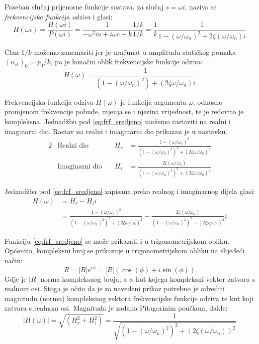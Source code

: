 Poseban slučaj prijenosne funkcije sustava, za slučaj $s=\omega i$, naziva se
\textit{frekvencijska funkcija odziva} i glasi:
\begin{equation} \label{eq:frf_nesredjeno}
    H(\omega i) = \frac{H(\omega i)}{P(\omega i)}
                = \frac{1}{-\omega^2 m + i\omega c + k}\frac{1/k}{1/k}
                = \frac{1}{k}\frac{1}{1-(\omega/\omega_n)^2+2\zeta(\omega/\omega_n)i}
\end{equation}

Član $1/k$ možemo zanemariti jer je uračunat u amplitudu statičkog pomaka $(u_{st})_0=p_0/k$,
pa je konačni oblik frekvencijske funkcije odziva:
\begin{equation}\label{eq:frf_sredjeno}
    H(\omega) = \frac{1}{\left(1-(\omega/\omega_n)^2\right)+\left(2\zeta\omega/\omega_n\right)i}
\end{equation}

Frekvencijska funkcija odziva $H(\omega)$ je funkcija argumenta $\omega$, odnosno promjenom
frekvencije pobude, mjenja se i njezina vrijednost, te je redovito je kompleksna.
Jednadžbu pod \eqref{eq:frf_sredjeno} možemo rastaviti na realni i imaginarni dio.
Rastav na realni i imaginarni dio prikazan je u nastavku.
\begin{alignat}{2}
    &\text{Realni dio} & H_r &= \frac{1-(\omega/\omega_n)^2}{(1-(\omega/\omega_n)^2)^2+(2\zeta\omega/\omega_n)^2}
        \label{eq:realni_dio_frf}\\
    &\text{Imaginarni dio}\quad & H_i &=\frac{2\zeta(\omega/\omega_n)}{(1-(\omega/\omega_n)^2)^2+(2\zeta\omega/\omega_n)^2}
        \label{eq:imaginarni_dio_frf}
\end{alignat}

Jednadžba pod \eqref{eq:frf_sredjeno} zapisana preko realnog i imaginarnog dijela
glasi:
\begin{equation}\label{eq:frf_pravokutni}
    \begin{split}
        H(\omega) &= H_r - H_ii  \\
              &= \frac{1-(\omega/\omega_n)^2}{(1-(\omega/\omega_n)^2)^2+(2\zeta\omega/\omega_n)^2}
              -\frac{2\zeta(\omega/\omega_n)}{(1-(\omega/\omega_n)^2)^2+(2\zeta\omega/\omega_n)^2}i
    \end{split}
\end{equation}

Funkciju \eqref{eq:frf_sredjeno} se može prikazati i u trigonometrijskom obliku.
Općenito, kompleksni broj se prikazuje u trigonometrijskom obliku na slijedeći
način:
\begin{equation}\label{eq:trig_zapis_kompleksni_br}
    R=|R|e^{i\phi} = |R|(\cos(\phi)+i\sin(\phi))
\end{equation}
Gdje je $|R|$ norma kompleksnog broja, a $\phi$ kut kojega kompleksni vektor zatvara
s realnom osi.
Stoga je očito da je za navedeni prikaz potrebno je odrediti magnitudu (normu) kompleksnog
vektora frekvencijske funkcije odziva te kut koji zatvara s realnom osi. Magnituda je 
zadana Pitagorinim poučkom, dakle:
\begin{equation}\label{eq:magnitudniSpektar}
    |H(\omega)|=\sqrt{(H_r^2+H_i^2)}
               =\frac{1}{\sqrt{(1-(\omega/\omega_n)^2)^2+(2\zeta(\omega/\omega_n))^2}}
\end{equation}

